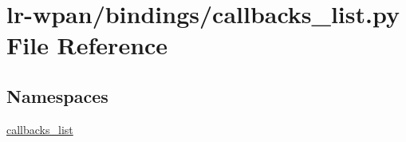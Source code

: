 \hypertarget{lr-wpan_2bindings_2callbacks__list_8py}{}\section{lr-\/wpan/bindings/callbacks\+\_\+list.py File Reference}
\label{lr-wpan_2bindings_2callbacks__list_8py}
\subsection*{Namespaces}
\begin{DoxyCompactItemize}
\item 
 \hyperlink{namespacecallbacks__list}{callbacks\+\_\+list}
\end{DoxyCompactItemize}
